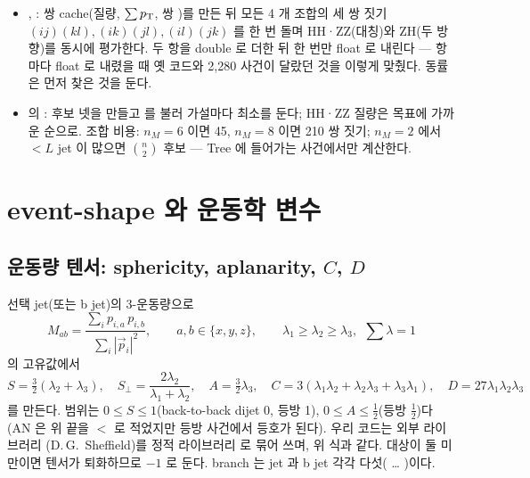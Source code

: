 \begin{impl}
\begin{itemize}
\item {}, : 쌍 cache(질량, $\sum p_{\mathrm{T}}$, 쌍 \pt)를 만든 뒤 모든 4 개 조합의 세 쌍 짓기
      $(ij)(kl), (ik)(jl), (il)(jk)$ 를 한 번 돌며 HH·ZZ(대칭)와 ZH(두 방향)를 동시에 평가한다. 두 항을 double 로 더한 뒤 한 번만 float 로
      내린다 — 항마다 float 로 내렸을 때 옛 코드와 2,280 사건이 달랐던 것을 이렇게 맞췄다. 동률은 먼저 찾은 것을 둔다.
\item {} 의 : 후보 넷을 만들고  를 불러 가설마다 최소를 둔다; HH·ZZ 질량은 목표에 가까운 순으로.
      조합 비용: $n_M=6$ 이면 45, $n_M=8$ 이면 210 쌍 짓기; $n_M=2$ 에서 $<L$ jet 이 많으면 $\binom{n}{2}$ 후보 — Tree 에 들어가는 사건에서만 계산한다.
\end{itemize}
\end{impl}

\section{event-shape 와 운동학 변수}\label{sec:reco-shape}

\subsection{운동량 텐서: sphericity, aplanarity, $C$, $D$}
선택 jet(또는 b jet)의 3-운동량으로
\begin{equation}
M_{ab}=\frac{\sum_i p_{i,a}\,p_{i,b}}{\sum_i|\vec p_i|^2},\qquad a,b\in\{x,y,z\},\qquad \lambda_1\ge\lambda_2\ge\lambda_3,\ \ \textstyle\sum\lambda=1
\label{eq:reco-tensor}
\end{equation}
의 고유값에서
\begin{equation}
S=\tfrac32(\lambda_2+\lambda_3),\quad S_\perp=\frac{2\lambda_2}{\lambda_1+\lambda_2},\quad A=\tfrac32\lambda_3,\quad
C=3(\lambda_1\lambda_2+\lambda_2\lambda_3+\lambda_3\lambda_1),\quad D=27\lambda_1\lambda_2\lambda_3
\label{eq:reco-shape}
\end{equation}
를 만든다. 범위는 $0\le S\le1$(back-to-back dijet 0, 등방 1), $0\le A\le\frac12$(등방 $\frac12$)다
(AN 은 위 끝을 $<$ 로 적었지만 등방 사건에서 등호가 된다). 우리 코드는 외부 라이브러리
(D.\,G.\ Sheffield)를 정적 라이브러리  로 묶어 쓰며, 위 식과 같다. 대상이 둘 미만이면
텐서가 퇴화하므로 $-1$ 로 둔다. branch 는 jet 과 b jet 각각 다섯( … )이다.

